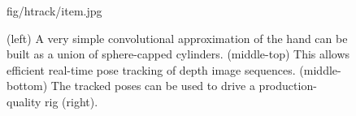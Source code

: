 \begin{figure}[b]
\begin{overpic} 
[width=\linewidth]
{fig/htrack/item.jpg}
\end{overpic}
\caption{
% 
(left) A very simple convolutional approximation of the hand can be built as a union of sphere-capped cylinders. (middle-top) This allows efficient real-time pose tracking of depth image sequences. (middle-bottom) The tracked poses can be used to drive a production-quality rig (right).
% 
}
\end{figure}
